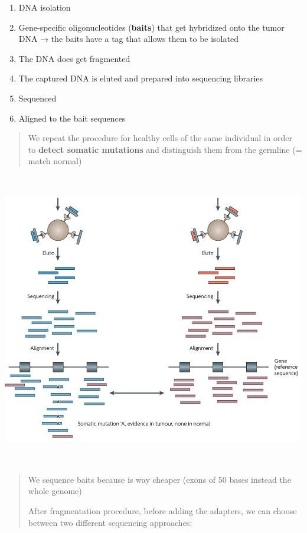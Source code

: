 \begin{enumerate}
\def\labelenumi{\arabic{enumi})}
\item
  DNA isolation
\item
  Gene-specific oligonucleotides (\textbf{baits}) that get hybridized
  onto the tumor DNA → the baits have a tag that allows them to be
  isolated
\item
  The DNA does get fragmented
\item
  The captured DNA is eluted and prepared into sequencing libraries
\item
  Sequenced
\item
  Aligned to the bait sequences
\end{enumerate}

\begin{quote}
We repeat the procedure for healthy cells of the same individual in
order to \textbf{detect somatic mutations} and distinguish them from the
germline (= match normal)
\end{quote}

\includegraphics[width=6.14828in,height=5.07625in]{image10.jpeg}

\begin{quote}
We sequence baits because is way cheaper (exons of 50 bases instead the
whole genome)

After fragmentation procedure, before adding the adapters, we can choose
between two different sequencing approaches:
\end{quote}

